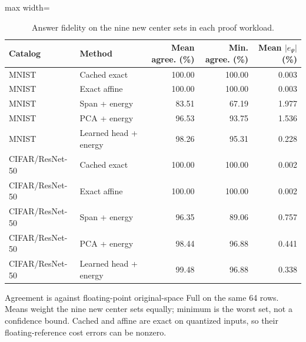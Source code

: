 \begin{table}[tp]
\caption{Answer fidelity on the nine new center sets in each proof workload.}\label{tab:reuse-quality}
\centering\small
\begin{adjustbox}{max width=\textwidth}
\begin{tabular}{@{}llrrr@{}}
\toprule
Catalog & Method & Mean agree. (\%) & Min. agree. (\%) & Mean $|e_\Psi|$ (\%) \\
\midrule
MNIST & Cached exact & 100.00 & 100.00 & 0.003 \\
MNIST & Exact affine & 100.00 & 100.00 & 0.003 \\
MNIST & Span + energy & 83.51 & 67.19 & 1.977 \\
MNIST & PCA + energy & 96.53 & 93.75 & 1.536 \\
MNIST & Learned head + energy & 98.26 & 95.31 & 0.228 \\
CIFAR/ResNet-50 & Cached exact & 100.00 & 100.00 & 0.002 \\
CIFAR/ResNet-50 & Exact affine & 100.00 & 100.00 & 0.002 \\
CIFAR/ResNet-50 & Span + energy & 96.35 & 89.06 & 0.757 \\
CIFAR/ResNet-50 & PCA + energy & 98.44 & 96.88 & 0.441 \\
CIFAR/ResNet-50 & Learned head + energy & 99.48 & 96.88 & 0.338 \\
\bottomrule
\end{tabular}
\end{adjustbox}
\par\smallskip\begin{minipage}{0.98\textwidth}\footnotesize Agreement is against floating-point original-space Full on the same 64 rows. Means weight the nine new center sets equally; minimum is the worst set, not a confidence bound. Cached and affine are exact on quantized inputs, so their floating-reference cost errors can be nonzero.\end{minipage}
\end{table}
